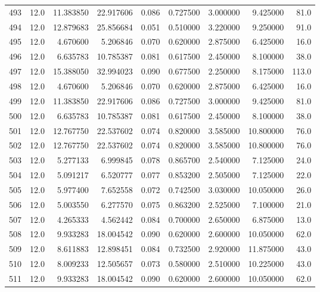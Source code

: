 \begin{tabular}{lrrrrrrrr}
493  &   12.0 &  11.383850 &  22.917606 &  0.086 &  0.727500 &  3.000000 &   9.425000 &   81.0 \\
494  &   12.0 &  12.879683 &  25.856684 &  0.051 &  0.510000 &  3.220000 &   9.250000 &   91.0 \\
495  &   12.0 &   4.670600 &   5.206846 &  0.070 &  0.620000 &  2.875000 &   6.425000 &   16.0 \\
496  &   12.0 &   6.635783 &  10.785387 &  0.081 &  0.617500 &  2.450000 &   8.100000 &   38.0 \\
497  &   12.0 &  15.388050 &  32.994023 &  0.090 &  0.677500 &  2.250000 &   8.175000 &  113.0 \\
498  &   12.0 &   4.670600 &   5.206846 &  0.070 &  0.620000 &  2.875000 &   6.425000 &   16.0 \\
499  &   12.0 &  11.383850 &  22.917606 &  0.086 &  0.727500 &  3.000000 &   9.425000 &   81.0 \\
500  &   12.0 &   6.635783 &  10.785387 &  0.081 &  0.617500 &  2.450000 &   8.100000 &   38.0 \\
501  &   12.0 &  12.767750 &  22.537602 &  0.074 &  0.820000 &  3.585000 &  10.800000 &   76.0 \\
502  &   12.0 &  12.767750 &  22.537602 &  0.074 &  0.820000 &  3.585000 &  10.800000 &   76.0 \\
503  &   12.0 &   5.277133 &   6.999845 &  0.078 &  0.865700 &  2.540000 &   7.125000 &   24.0 \\
504  &   12.0 &   5.091217 &   6.520777 &  0.077 &  0.853200 &  2.505000 &   7.125000 &   22.0 \\
505  &   12.0 &   5.977400 &   7.652558 &  0.072 &  0.742500 &  3.030000 &  10.050000 &   26.0 \\
506  &   12.0 &   5.003550 &   6.277570 &  0.075 &  0.863200 &  2.525000 &   7.100000 &   21.0 \\
507  &   12.0 &   4.265333 &   4.562442 &  0.084 &  0.700000 &  2.650000 &   6.875000 &   13.0 \\
508  &   12.0 &   9.933283 &  18.004542 &  0.090 &  0.620000 &  2.600000 &  10.050000 &   62.0 \\
509  &   12.0 &   8.611883 &  12.898451 &  0.084 &  0.732500 &  2.920000 &  11.875000 &   43.0 \\
510  &   12.0 &   8.009233 &  12.505657 &  0.073 &  0.580000 &  2.510000 &  10.225000 &   43.0 \\
511  &   12.0 &   9.933283 &  18.004542 &  0.090 &  0.620000 &  2.600000 &  10.050000 &   62.0 \\

\end{tabular}
